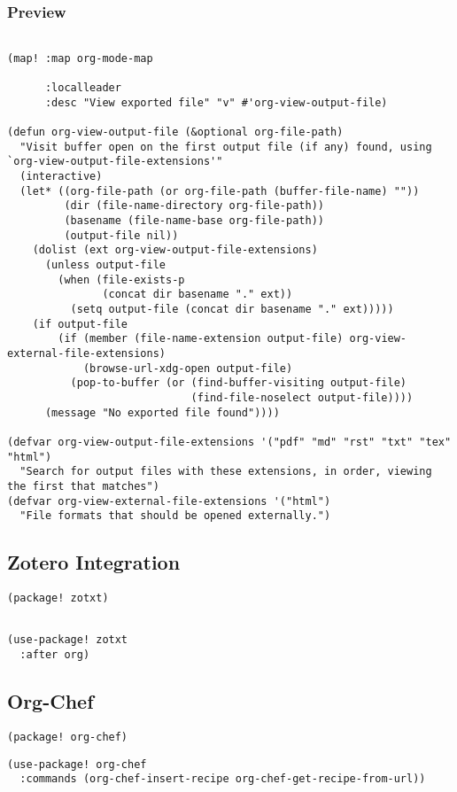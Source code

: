 \documentclass[c]{article}
\theoremstyle{plain}%
\theoremstyle{definition}
\theoremstyle{remark}
\begin{document}
\subsubsection{Preview}
\label{sec:orgfb73b81}
\begin{verbatim}

(map! :map org-mode-map

      :localleader
      :desc "View exported file" "v" #'org-view-output-file)

(defun org-view-output-file (&optional org-file-path)
  "Visit buffer open on the first output file (if any) found, using `org-view-output-file-extensions'"
  (interactive)
  (let* ((org-file-path (or org-file-path (buffer-file-name) ""))
         (dir (file-name-directory org-file-path))
         (basename (file-name-base org-file-path))
         (output-file nil))
    (dolist (ext org-view-output-file-extensions)
      (unless output-file
        (when (file-exists-p
               (concat dir basename "." ext))
          (setq output-file (concat dir basename "." ext)))))
    (if output-file
        (if (member (file-name-extension output-file) org-view-external-file-extensions)
            (browse-url-xdg-open output-file)
          (pop-to-buffer (or (find-buffer-visiting output-file)
                             (find-file-noselect output-file))))
      (message "No exported file found"))))

(defvar org-view-output-file-extensions '("pdf" "md" "rst" "txt" "tex" "html")
  "Search for output files with these extensions, in order, viewing the first that matches")
(defvar org-view-external-file-extensions '("html")
  "File formats that should be opened externally.")
\end{verbatim}
\subsection{Zotero Integration}
\label{sec:orga910ddd}
\begin{verbatim}
(package! zotxt)
\end{verbatim}
\begin{verbatim}

(use-package! zotxt
  :after org)
\end{verbatim}
\subsection{Org-Chef}
\label{sec:org3b8a609}
\begin{verbatim}
(package! org-chef)
\end{verbatim}
\begin{verbatim}
(use-package! org-chef
  :commands (org-chef-insert-recipe org-chef-get-recipe-from-url))
\end{verbatim}
\end{document}
